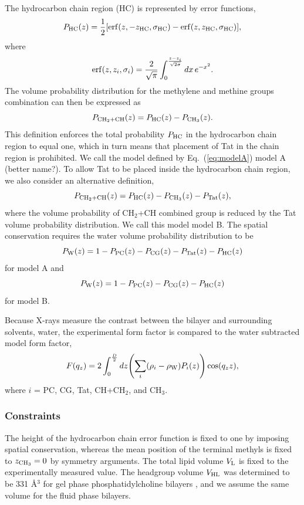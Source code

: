 The hydrocarbon chain region (HC) is represented by error functions,
\begin{equation}
  P_\textrm{HC}(z) = \frac{1}{2}\mathopen{}\left[ 
    \mathrm{erf}(z,-z_\textrm{HC},\sigma_\textrm{HC}) - \mathrm{erf}(z,z_\textrm{HC},\sigma_\textrm{HC})
   \right]\mathclose{},
\end{equation}
where
\begin{equation}
  \mathrm{erf}(z,z_i,\sigma_i)=\frac{2}{\sqrt{\pi}}
    \int_0^{\frac{z-z_i}{\sqrt{2\sigma}}} \mathop{dx} e^{-x^2}.
\end{equation}
The volume probability distribution for the methylene and methine groups 
combination can then be expressed as
\begin{equation}
  P_{\textrm{CH}_2+\textrm{CH}}(z) = P_\textrm{HC}(z)-P_{\textrm{CH}_3}(z).
  \label{eq:modelA}
\end{equation}
This definition enforces the total probability $P_\textrm{HC}$ in the hydrocarbon
chain region to equal one, which in turn means that placement of Tat in the  
chain region is prohibited. We call the model defined by Eq.~(\ref{eq:modelA})
model A (better name?). To allow Tat to be placed inside the hydrocarbon
chain region, we also consider an alternative definition,
\begin{equation}
  P_{\textrm{CH}_2+\textrm{CH}}(z) = P_\textrm{HC}(z)-P_{\textrm{CH}_3}(z) - P_\textrm{Tat}(z),
\end{equation}
where the volume probability of CH$_2$+CH combined group is reduced by 
the Tat volume probability distribution. We call this model model B.
The spatial conservation requires the water volume probability distribution 
to be
\begin{equation}
  P_\textrm{W}(z) = 1-P_\textrm{PC}(z)-P_\textrm{CG}(z)-P_\textrm{Tat}(z)-P_\textrm{HC}(z)
\end{equation}
for model A and
\begin{equation}
  P_\textrm{W}(z) = 1-P_\textrm{PC}(z)-P_\textrm{CG}(z)-P_\textrm{HC}(z)
\end{equation}
for model B.

Because X-rays measure the contrast between the bilayer and surrounding solvents, 
water, the experimental form factor is compared to the water subtracted model
form factor,
\begin{equation}
  F(q_z) = 2\int_0^{\frac{D}{2}} \mathop{dz} \mathopen{}\left( 
    \sum_i(\rho_i-\rho_\textrm{W})P_i(z)
   \right)\mathclose{} \cos(q_zz),
\end{equation}
where $i$ = PC, CG, Tat, CH+CH$_2$, and CH$_3$.

\subsubsection{Constraints}
The height of the hydrocarbon chain error function is fixed to one by imposing
spatial conservation, whereas the mean position of the terminal methyls is
fixed to $z_{\textrm{CH}_3}=0$ by symmetry arguments. The total lipid volume
$V_\textrm{L}$ is fixed to the experimentally measured value. 
The headgroup volume $V_\textrm{HL}$ was determined to be 331 \AA$^3$ for 
gel phase phosphatidylcholine bilayers \cite{ref:Tristram-Nagle02},
and we assume the same volume for the fluid phase bilayers.

